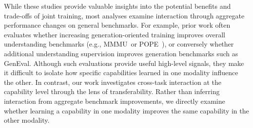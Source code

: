 While these studies provide valuable insights into the potential benefits and trade-offs of joint training, most analyses examine interaction through aggregate performance changes on general benchmarks. For example, prior work often evaluates whether increasing generation-oriented training improves overall understanding benchmarks (e.g., MMMU~\cite{yue2024mmmu}or POPE~\cite{li2023pope}), or conversely whether additional understanding supervision improves generation benchmarks such as GenEval. Although such evaluations provide useful high-level signals, they make it difficult to isolate how specific capabilities learned in one modality influence the other. In contrast, our work investigates cross-task interaction at the capability level through the lens of transferability. Rather than inferring interaction from aggregate benchmark improvements, we directly examine whether learning a capability in one modality improves the same capability in the other modality. 